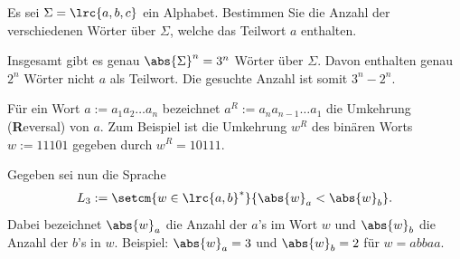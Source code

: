 \begin{questions}
	Es sei $\Sigma = \lrc{a, b, c}$ ein Alphabet. Bestimmen Sie die Anzahl der verschiedenen Wörter über $\Sigma$, welche das Teilwort $a$ enthalten.
	\begin{solution}
		Insgesamt gibt es genau $\abs{\Sigma}^n = 3^n$ Wörter über $\Sigma$. Davon enthalten genau $2^n$ Wörter nicht $a$ als Teilwort. Die gesuchte Anzahl ist somit $3^n - 2^n$.
	\end{solution}
	\droptotalpoints
	\clearpage



	Für ein Wort $a := a_1a_2\ldots a_n$ bezeichnet $a^R := a_na_{n-1}\ldots a_1$ die Umkehrung (\textbf{R}eversal) von
	$a$. Zum Beispiel ist die Umkehrung $w^R$ des binären Worts $w := 11101$ gegeben durch $w^R = 10111$.

	Gegeben sei nun die Sprache
	\begin{align*}
		L_3 := \setcm{w\in\lrc{a,b}^*}{\abs{w}_a < \abs{w}_b}.
	\end{align*}
	Dabei bezeichnet $\abs{w}_a$ die Anzahl der $a$'s im Wort $w$ und $\abs{w}_b$ die Anzahl der $b$'s in $w$. Beispiel: $\abs{w}_a = 3$ und $\abs{w}_b = 2$ für $w = abbaa$.
\end{questions}
